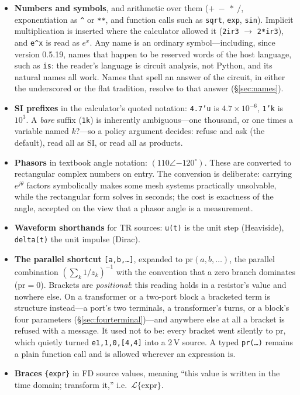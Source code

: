 \documentclass[11pt,oneside]{report}
\newcommand{\code}[1]{\texttt{#1}}
\begin{document}
\begin{itemize}
\item \textbf{Numbers and symbols}, and arithmetic over them
  ($+\ -\ *\ /$, exponentiation as \code{\^{}} or \code{**}, and
  function calls such as \code{sqrt}, \code{exp}, \code{sin}).
  Implicit multiplication is inserted where the calculator allowed it
  (\code{2ir3} $\to$ \code{2*ir3}), and \code{e\^{}x} is read as
  $e^x$. Any name is an ordinary symbol---including, since version
  0.5.19, names that happen to be reserved words of the host
  language, such as \code{is}: the reader's language is circuit
  analysis, not Python, and its natural names all work. Names that
  spell an answer of the circuit, in either the underscored or the
  flat tradition, resolve to that answer (\S\ref{sec:names}).
\item \textbf{SI prefixes} in the calculator's quoted notation:
  \code{4.7'u} is $4.7\times10^{-6}$, \code{1'k} is $10^3$. A
  \emph{bare} suffix (\code{1k}) is inherently ambiguous---one
  thousand, or one times a variable named $k$?---so a policy argument
  decides: refuse and ask (the default), read all as SI, or read all
  as products.
\item \textbf{Phasors} in textbook angle notation:
  $(110\angle{-120}^{\circ})$. These are converted to rectangular
  complex numbers on entry. The conversion is deliberate: carrying
  $e^{j\theta}$ factors symbolically makes some mesh systems
  practically unsolvable, while the rectangular form solves in
  seconds; the cost is exactness of the angle, accepted on the view
  that a phasor angle is a measurement.
\item \textbf{Waveform shorthands} for TR sources: \code{u(t)} is the
  unit step (Heaviside), \code{delta(t)} the unit impulse (Dirac).
\item \textbf{The parallel shortcut} \code{[a,b,\ldots]}, expanded to
  $\mathrm{pr}(a,b,\ldots)$, the parallel combination
  $(\sum_k 1/z_k)^{-1}$ with the convention that a zero branch
  dominates ($\mathrm{pr}=0$). Brackets are \emph{positional}: this
  reading holds in a resistor's value and nowhere else. On a
  transformer or a two-port block a bracketed term is structure
  instead---a port's two terminals, a transformer's turns, or a
  block's four parameters (\S\ref{sec:fourterminal})---and anywhere
  else at all a bracket is refused with a message. It used not to be:
  every bracket went silently to $\mathrm{pr}$, which quietly turned
  \code{e1,1,0,[4,4]} into a 2\,V source. A typed \code{pr(\ldots)}
  remains a plain function call and is allowed wherever an expression
  is.
\item \textbf{Braces} \code{\{expr\}} in FD source values, meaning
  ``this value is written in the time domain; transform it,'' i.e.\
  $\mathcal{L}\{\mathrm{expr}\}$.
\end{itemize}
\end{document}
